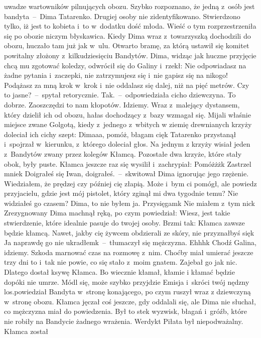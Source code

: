 \documentclass[../MAIN.tex]{subfiles}
\begin{document}
uwadze wartowników pilnujących obozu. Szybko rozpoznano, że jedną z~osób jest
bandyta~--~Dima Tatarenko. Drugiej osoby nie zidentyfikowano. Stwierdzono tylko,
iż jest to kobieta i~to w~dodatku dość młoda. Wieść o tym rozprzestrzeniła się
po obozie niczym błyskawica. Kiedy Dima wraz z~towarzyszką dochodzili do obozu,
huczało tam już jak w~ulu. Otwarto bramę, za którą ustawił się komitet powitalny
złożony z~kilkudziesięciu Bandytów. Dima, widząc jak huczne przyjęcie chcą mu
zgotować koledzy, odwrócił się do Galiny i~rzekł:
\sx
Nie odpowiadasz na żadne pytania i~zaczepki, nie zatrzymujesz się i~nie
gapisz się na nikogo! Podążasz za mną krok w~krok i~nie oddalasz się dalej, niż
na pięć metrów. Czy to jasne?~--~spytał retorycznie.
\xx  Tak.~--~odpowiedziała cicho dziewczyna.
\xx  To dobrze. Zaoszczędzi to nam kłopotów. Idziemy.
\qm
Wraz z~malejący dystansem, który dzielił ich od obozu, hałas dochodzący z~bazy
wzmagał się. Mijali właśnie miejsce zwane Golgotą, kiedy z~jednego z~wbitych w
ziemię drewnianych krzyży doleciał ich cichy szept:
\sx
Dimaaa, pomóż, błagam cię\3k
\qm
Tatarenko przystanął i~spojrzał w~kierunku, z~którego doleciał głos. Na jednym z
krzyży wisiał jeden z~Bandytów zwany przez kolegów Kłamcą. Pozostałe dwa krzyże,
które stały obok, były puste. Kłamca jeszcze raz się wysilił i~zachrypiał:
\sx Pomóżżż\3k Zastrzel mnie\3k
\xx  Doigrałeś się Iwan, doigrałeś.~--~skwitował Dima ignorując jego rzężenie. \xx
Wiedziałem, że prędzej czy później cię złapią. Może i~bym ci pomógł, ale powiedz
przyjacielu, gdzie jest mój pistolet, który zginął mi dwa tygodnie temu? Nie
widziałeś go czasem?
\xx  Dima, to nie byłem ja. Przysięgam\3k Nie miałem z~tym nic\3k
\qm
Zrezygnowany Dima machnął ręką, po czym powiedział:
\sx Wiesz, jest takie stwierdzenie, które idealnie pasuje do twojej osoby. Brzmi
tak: Kłamca zawsze będzie kłamcą. Nawet, jakby cię żywcem obdzierali ze skóry,
nie przyznałbyś się\3k
\xx  Ja naprawdę go nie ukradłem\3k~--~tłumaczył się mężczyzna.
\xx  Ehhh\3k Chodź Galina, idziemy. Szkoda marnować czas na rozmowę z~nim. Choćby
miał umierać jeszcze trzy dni to i~tak nie powie, co się stało z~moim gnatem.
Zajebał go jak nic. Dlatego dostał ksywę Kłamca. Bo wiecznie kłamał, kłamie i
kłamać będzie dopóki nie umrze. Módl się, może szybko przyjdzie Emisja i~skróci
twój nędzny los.\x powiedział Bandyta w~stronę konającego, po czym ruszył wraz
z dziewczyną w~stronę obozu.
\qm
Kłamca jęczał coś jeszcze, gdy oddalali się, ale Dima nie słuchał, co mężczyzna
miał do powiedzenia. Był to stek wyzwisk, błagań i~gróźb, które nie robiły na
Bandycie żadnego wrażenia. Werdykt Piłata był niepodważalny. Kłamca został
\end{document}
